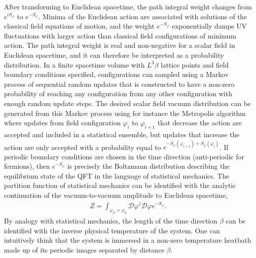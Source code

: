 After transforming to Euclidean spacetime, the path integral weight changes from $e^{iS_\varphi}$ to $e^{-S_\varphi}$.
Minima of the Euclidean action are associated with solutions of the classical field equations of motion, and the weight $e^{-S_\varphi}$ exponentially damps UV fluctuations with larger action than classical field configurations of minimum action.
The path integral weight is real and non-negative for a scalar field in Euclidean spacetime, and it can therefore be interpreted as a probability distribution.
In a finite spacetime volume with $L^3 \beta$ lattice points and field boundary conditions specified, configurations can sampled using a Markov process of sequential random updates that is constructed to have a non-zero probability of reaching any configuration from any other configuration with enough random update steps.
The desired scalar field vacuum distribution can be generated from this Markov process using for instance the Metropolis algorithm where updates from field configuration $\varphi_i$ to $\varphi_{i+1}$ that decrease the action are accepted and included in a statistical ensemble, but updates that increase the action are only accepted with a probability equal to $e^{-S_\varphi(\varphi_{i+1})+S_\varphi(\varphi_i)}$.
If periodic boundary conditions are chosen in the time direction (anti-periodic for fermions), then $e^{-S_\varphi}$ is precisely the Boltzmann distribution describing the equilibrium state of the QFT in the language of statistical mechanics.
The partition function of statistical mechanics can be identified with the analytic continuation of the vacuum-to-vacuum amplitude to Euclidean spacetime,
\begin{equation}
  \begin{split}
    Z = \int_{\varphi_\beta=\varphi_0}\mathcal{D}\varphi^\dagger \mathcal{D}\varphi e^{-S_\varphi}.
  \end{split}\label{eq:scalarZdef}
\end{equation}
By analogy with statistical mechanics, the length of the time direction $\beta$ can be identified with the inverse physical temperature of the system.
One can intuitively think that the system is immersed in a non-zero temperature heatbath made up of its periodic images separated by distance $\beta$.

